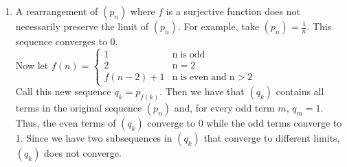\documentclass[12pt]{article}
\newenvironment{problem}[2][Problem]{\begin{trivlist}
\item[\hskip \labelsep {\bfseries #1}\hskip \labelsep {\bfseries #2.}]}{\end{trivlist}}
\begin{document}
\begin{enumerate}[label=(\alph*)]
	\item A rearrangement of $(p_n)$ where $f$ is a surjective function does not necessarily preserve the limit of $(p_n)$. For example, take $(p_n) = \frac{1}{n}$. This sequence converges to 0.\\
	
	Now let $f(n) = \begin{cases} 
      1 & \mathrm{n \; is \; odd}\\
      2 & \mathrm{n = 2}\\
      f(n-2)+1 & \mathrm{n \; is \; even \; and \; n > 2}
   \end{cases}$\\
   
   Call this new sequence $q_k = p_{f(k)}$. Then we have that $(q_k)$ contains all terms in the original sequence $(p_n)$ and, for every odd term $m$, $q_m = 1$. Thus, the even terms of $(q_k)$ converge to 0 while the odd terms converge to 1. Since we have two subsequences in $(q_k)$ that converge to different limits, $(q_k)$ does not converge.
\end{enumerate}

\begin{problem}{44 on p. 128}
\end{problem}
\end{document}
